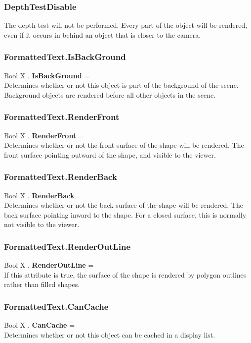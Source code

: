 \documentclass[10pt]{book}
\begin{document}
\subsubsection{DepthTestDisable \label{T:DepthTest|DepthTestDisable}}
The depth test will not be performed. Every part of the object will be rendered, even if it occurs in behind an object that is closer to the camera.

\subsubsection{FormattedText.IsBackGround \label{F:FormattedText:IsBackGround}}
Bool X . \textbf{IsBackGround} = \\
Determines whether or not this object is part of the background of the scene. Background objects are rendered before all other objects in the scene.

\subsubsection{FormattedText.RenderFront \label{F:FormattedText:RenderFront}}
Bool X . \textbf{RenderFront} = \\
Determines whether or not the front surface of the shape will be rendered. The front surface pointing outward of the shape, and visible to the viewer.

\subsubsection{FormattedText.RenderBack \label{F:FormattedText:RenderBack}}
Bool X . \textbf{RenderBack} = \\
Determines whether or not the back surface of the shape will be rendered. The back surface pointing inward to the shape. For a closed surface, this is normally not visible to the viewer.

\subsubsection{FormattedText.RenderOutLine \label{F:FormattedText:RenderOutLine}}
Bool X . \textbf{RenderOutLine} = \\
If this attribute is true, the surface of the shape is rendered by polygon outlines rather than filled shapes.

\subsubsection{FormattedText.CanCache \label{F:FormattedText:CanCache}}
Bool X . \textbf{CanCache} = \\
Determines whether or not this object can be cached in a display list.
\end{document}
